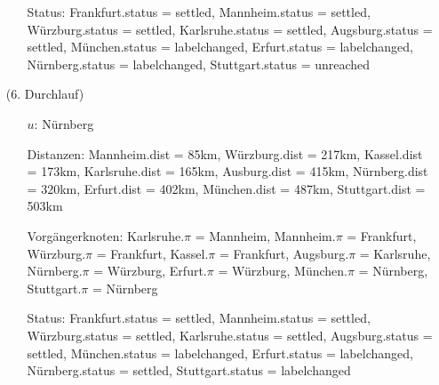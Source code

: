 \documentclass{article}
\begin{document}
\begin{itemize}
\begin{itemize}
\item[Status:] Frankfurt.status = settled, Mannheim.status = settled, Würzburg.status = settled, Karlsruhe.status = settled, Augsburg.status = settled, München.status = labelchanged, Erfurt.status = labelchanged, Nürnberg.status = labelchanged, Stuttgart.status = unreached \\
\end{itemize}
\item[(6. Durchlauf)]
\begin{itemize}
\item[$u$:] Nürnberg \\
\item[Distanzen:] Mannheim.dist = 85km, Würzburg.dist = 217km, Kassel.dist = 173km, Karlsruhe.dist = 165km, Ausburg.dist = 415km, Nürnberg.dist = 320km, Erfurt.dist = 402km, München.dist = 487km, Stuttgart.dist = 503km \\
\item[Vorgängerknoten:] Karlsruhe.$\pi$ = Mannheim,  Mannheim.$\pi$ = Frankfurt, Würzburg.$\pi$ = Frankfurt, Kassel.$\pi$ = Frankfurt, Augsburg.$\pi$ = Karlsruhe, Nürnberg.$\pi$ = Würzburg, Erfurt.$\pi$ = Würzburg, München.$\pi$ = Nürnberg, Stuttgart.$\pi$ = Nürnberg \\
\item[Status:] Frankfurt.status = settled, Mannheim.status = settled, Würzburg.status = settled, Karlsruhe.status = settled, Augsburg.status = settled, München.status = labelchanged, Erfurt.status = labelchanged, Nürnberg.status = settled, Stuttgart.status = labelchanged \\
\end{itemize}
\end{itemize}
\end{document}
